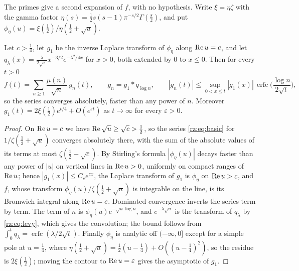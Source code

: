 The primes give a second expansion of $f$, with no hypothesis. Write $\xi=\eta\zeta$ with the gamma factor $\eta(s)=\frac12s(s-1)\pi^{-s/2}\Gamma(\frac s2)$, and put $\phi_\eta(u)=\xi(\frac12)/\eta(\frac12+\sqrt u)$.

\begin{proposition}\label{tx3:prop:mobius}
Let $c>\frac14$, let $g_1$ be the inverse Laplace transform of $\phi_\eta$ along $\operatorname{Re} u=c$, and let $q_\lambda(x)=\frac{\lambda}{2\sqrt\pi}x^{-3/2}e^{-\lambda^2/4x}$ for $x>0$, both extended by $0$ to $x\le0$. Then for every $t>0$
\[
f(t)=\sum_{n\ge1}\frac{\mu(n)}{\sqrt n}\,g_n(t),\qquad g_n=g_1*q_{\log n},\qquad|g_n(t)|\le\sup_{0<x\le t}|g_1(x)|\,\operatorname{erfc}\Big(\frac{\log n}{2\sqrt t}\Big),
\]
so the series converges absolutely, faster than any power of $n$. Moreover $g_1(t)=2\xi(\tfrac12)e^{t/4}+O(e^{\varepsilon t})$ as $t\to\infty$ for every $\varepsilon>0$.
\end{proposition}

\begin{proof}
On $\operatorname{Re} u=c$ we have $\operatorname{Re}\sqrt u\ge\sqrt c>\frac12$, so the series \eqref{rz:eq:basic} for $1/\zeta(\frac12+\sqrt u)$ converges absolutely there, with the sum of the absolute values of its terms at most $\zeta(\frac12+\sqrt c)$. By Stirling's formula $|\phi_\eta(u)|$ decays faster than any power of $|u|$ on vertical lines in $\operatorname{Re} u>0$, uniformly on compact ranges of $\operatorname{Re} u$; hence $|g_1(x)|\le C_ce^{cx}$, the Laplace transform of $g_1$ is $\phi_\eta$ on $\operatorname{Re} u>c$, and $f$, whose transform $\phi_\eta(u)/\zeta(\frac12+\sqrt u)$ is integrable on the line, is its Bromwich integral along $\operatorname{Re} u=c$. Dominated convergence inverts the series term by term. The term of $n$ is $\phi_\eta(u)e^{-\sqrt u\log n}$, and $e^{-\lambda\sqrt u}$ is the transform of $q_\lambda$ by \eqref{rz:eq:levy}, which gives the convolution; the bound follows from $\int_0^tq_\lambda=\operatorname{erfc}(\lambda/2\sqrt t)$. Finally $\phi_\eta$ is analytic off $(-\infty,0]$ except for a simple pole at $u=\frac14$, where $\eta(\frac12+\sqrt u)=\frac12(u-\frac14)+O((u-\frac14)^2)$, so the residue is $2\xi(\frac12)$; moving the contour to $\operatorname{Re} u=\varepsilon$ gives the asymptotic of $g_1$.
\end{proof}

